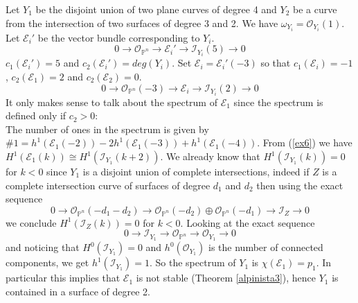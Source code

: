 \documentclass[
	oldfontcommands,
	sumario=abnt-6027-2012,
	12pt,			%
	openright,		%
	oneside,		%
	a4paper,		%
	english,		%
	brazil			%
	]{imecc-unicamp}
\begin{document}
\begin{example}\label{exemplobeilinson3}
Let $Y_1$ be the disjoint union of two plane curves of degree 4 and $Y_2$ be a curve from the intersection of two surfaces of degree 3 and 2. We have $\omega_{Y_i}=\mathcal{O}_{Y_i}(1)$. Let $\mathcal{E}_i'$ be the vector bundle corresponding to $Y_i$. 
\begin{equation}
0 \to \mathcal{O}_{\mathbb{P}^n} \to \mathcal{E}_i' \to \mathcal{I}_{Y_i}(5) \to 0
\end{equation}
$c_1(\mathcal{E}_i')=5$ and $c_2(\mathcal{E}_i')=deg(Y_i)$. Set $\mathcal{E}_i=\mathcal{E}_i'(-3)$ so that $c_1(\mathcal{E}_i)=-1$, $c_2(\mathcal{E}_1)=2$ and $c_2(\mathcal{E}_2)=0$.
\begin{equation}\label{ex6}
0 \to \mathcal{O}_{\mathbb{P}^n}(-3) \to \mathcal{E}_i \to \mathcal{I}_{Y_i}(2) \to 0
\end{equation}
It only makes sense to talk about the spectrum of $\mathcal{E}_1$ since the spectrum is defined only if $c_2 > 0$:\\
The number of ones in the spectrum is given by $\# 1 = h^1(\mathcal{E}_1(-2))-2h^1(\mathcal{E}_1(-3))+h^1(\mathcal{E}_1(-4))$. From (\ref{ex6}) we have $H^1(\mathcal{E}_1(k)) \cong H^1(\mathcal{I}_{Y_1}(k+2))$. We already know that $H^1(\mathcal{I}_{Y_1}(k))=0$ for $k<0$ since $Y_1$ is a disjoint union of complete intersections, indeed if $Z$ is a complete intersection curve of surfaces of degree $d_1$ and $d_2$ then using the exact sequence $$0 \to \mathcal{O}_{\mathbb{P}^n}(-d_1-d_2) \to \mathcal{O}_{\mathbb{P}^n}(-d_2) \oplus \mathcal{O}_{\mathbb{P}^n}(-d_1) \to \mathcal{I}_Z \to 0$$ we conclude $H^1(\mathcal{I}_{Z}(k))=0$ for $k<0$. Looking at the exact sequence $$0 \to \mathcal{I}_{Y_1} \to \mathcal{O}_{\mathbb{P}^n} \to \mathcal{O}_{Y_1} \to 0$$ and noticing that $H^0(\mathcal{I}_{Y_1})=0$ and $h^0(\mathcal{O}_{Y_1})$ is the number of connected components, we get $h^1(\mathcal{I}_{Y_1})=1$. So the spectrum of $Y_1$ is $\chi(\mathcal{E}_1)=p_1$. In particular this implies that $\mathcal{E}_1$ is not stable (Theorem \ref{alpinista3}), hence $Y_1$ is contained in a surface of degree 2.\\

\end{example}
\end{document}
